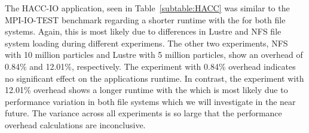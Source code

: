
The HACC-IO application, seen in Table~\ref{subtable:HACC} was similar to the MPI-IO-TEST 
benchmark regarding a shorter runtime with the \connector{} for both file systems. Again, 
this is most likely due to differences in Lustre and NFS file system loading during different
experimens. The other two experiments, NFS with 10 million particles and Lustre with 
5 million particles, show an overhead of 0.84\% and 12.01\%, respectively. The experiment 
with 0.84\% overhead indicates no significant effect on the applications runtime. 
In contrast, the experiment with 12.01\% overhead shows a longer runtime with the 
\connector{} which is most likely due to performance variation in both file systems 
which we will investigate in the near future. The variance across all experiments is 
so large that the performance overhead calculations are inconclusive. 



